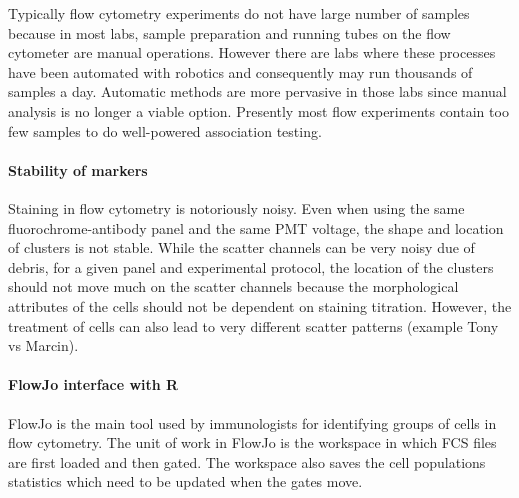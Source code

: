 Typically flow cytometry experiments do not have large number of samples because in most labs, sample preparation and running tubes on the flow cytometer are manual operations.
However there are labs where these processes have been automated with robotics
and consequently may run thousands of samples a day.
Automatic methods are more pervasive in those labs since manual analysis is no longer a viable option.
Presently most flow experiments contain too few samples to do well-powered association testing.


\paragraph{ Stability of markers }

Staining in flow cytometry is notoriously noisy.
Even when using the same fluorochrome-antibody panel and the same PMT voltage, the shape and location of clusters is not stable.
While the scatter channels can be very noisy due of debris, for a given panel and experimental protocol,
the location of the clusters should not move much on the scatter channels because the morphological attributes of the cells should not be dependent on staining titration.
However, the treatment of cells can also lead to very different scatter patterns (example Tony vs Marcin).


\paragraph{ FlowJo interface with R}

FlowJo is the main tool used by immunologists for identifying groups of cells in flow cytometry.
The unit of work in FlowJo is the workspace in which FCS files are first loaded and then gated.
The workspace also saves the cell populations statistics which need to be updated when the gates move.

